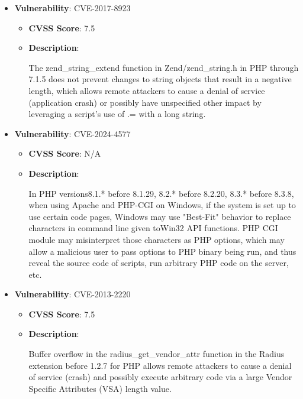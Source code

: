 \documentclass{article}
\begin{document}
\begin{itemize}
        \item \textbf{Vulnerability}: CVE-2017-8923
        \begin{itemize}
            \item \textbf{CVSS Score}:  7.5 
            \item \textbf{Description}:
            \parbox[t]{0.9\linewidth}{
                \ttfamily The zend\_string\_extend function in Zend/zend\_string.h in PHP through 7.1.5 does not prevent changes to string objects that result in a negative length, which allows remote attackers to cause a denial of service (application crash) or possibly have unspecified other impact by leveraging a script's use of .= with a long string.
            }
        \end{itemize}
    
        \item \textbf{Vulnerability}: CVE-2024-4577
        \begin{itemize}
            \item \textbf{CVSS Score}:  N/A 
            \item \textbf{Description}:
            \parbox[t]{0.9\linewidth}{
                \ttfamily In PHP versions8.1.* before 8.1.29, 8.2.* before 8.2.20, 8.3.* before 8.3.8, when using Apache and PHP-CGI on Windows, if the system is set up to use certain code pages, Windows may use "Best-Fit" behavior to replace characters in command line given toWin32 API functions. PHP CGI module may misinterpret those characters as PHP options, which may allow a malicious user to pass options to PHP binary being run, and thus reveal the source code of scripts, run arbitrary PHP code on the server, etc.
            }
        \end{itemize}
    
        \item \textbf{Vulnerability}: CVE-2013-2220
        \begin{itemize}
            \item \textbf{CVSS Score}:  7.5 
            \item \textbf{Description}:
            \parbox[t]{0.9\linewidth}{
                \ttfamily Buffer overflow in the radius\_get\_vendor\_attr function in the Radius extension before 1.2.7 for PHP allows remote attackers to cause a denial of service (crash) and possibly execute arbitrary code via a large Vendor Specific Attributes (VSA) length value.
            }
        \end{itemize}
    

\end{itemize}
\end{document}
